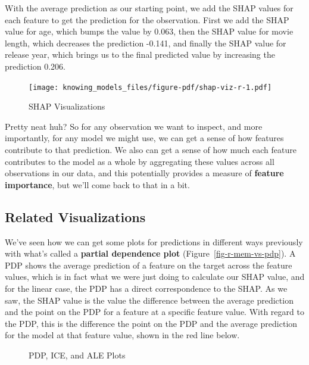 \documentclass[
  letterpaper,
]{krantz}
\begin{document}
With the average prediction as our starting point, we add the SHAP
values for each feature to get the prediction for the observation. First
we add the SHAP value for age, which bumps the value by 0.063, then the
SHAP value for movie length, which decreases the prediction -0.141, and
finally the SHAP value for release year, which brings us to the final
predicted value by increasing the prediction 0.206.

\begin{figure}[H]

{\centering \texttt{[image: knowing\_models\_files/figure-pdf/shap-viz-r-1.pdf]}

}

\caption{SHAP Visualizations}

\end{figure}%

Pretty neat huh? So for any observation we want to inspect, and more
importantly, for any model we might use, we can get a sense of how
features contribute to that prediction. We also can get a sense of how
much each feature contributes to the model as a whole by aggregating
these values across all observations in our data, and this potentially
provides a measure of \textbf{feature importance}, but we'll come back
to that in a bit.

\subsection{Related Visualizations}\label{related-visualizations}

We've seen how we can get some plots for predictions in different ways
previously with what's called a \textbf{partial dependence plot}
(Figure~\ref{fig-r-mem-vs-pdp}). A PDP shows the average prediction of a
feature on the target across the feature values, which is in fact what
we were just doing to calculate our SHAP value, and for the linear case,
the PDP has a direct correspondence to the SHAP. As we saw, the SHAP
value is the value the difference between the average prediction and the
point on the PDP for a feature at a specific feature value. With regard
to the PDP, this is the difference the point on the PDP and the average
prediction for the model at that feature value, shown in the red line
below.

\begin{figure}[H]


\caption{\label{fig-pdp-ice-r}PDP, ICE, and ALE Plots}

\end{figure}%
\end{document}

